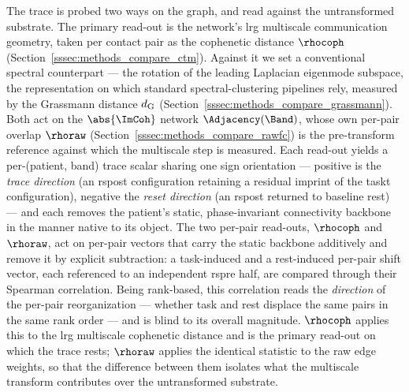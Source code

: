%
The trace is probed two ways on the graph, and read against the untransformed substrate. The primary read-out is the network's \gls{lrg} multiscale communication geometry, taken per contact pair as the cophenetic distance \(\rhocoph\) (Section~\ref{sssec:methods_compare_ctm}). Against it we set a conventional spectral counterpart --- the rotation of the leading Laplacian eigenmode subspace, the representation on which standard spectral-clustering pipelines rely, measured by the Grassmann distance \(d_{\rm G}\) (Section~\ref{sssec:methods_compare_grassmann}). Both act on the \(\abs{\ImCoh}\) network \(\Adjacency(\Band)\), whose own per-pair overlap \(\rhoraw\) (Section~\ref{sssec:methods_compare_rawfc}) is the pre-transform reference against which the multiscale step is measured. Each read-out yields a per-(patient, band) trace scalar sharing one sign orientation --- positive is the \emph{trace direction} (an \acrshort{rspost} configuration retaining a residual imprint of the \acrshort{taskt} configuration), negative the \emph{reset direction} (an \acrshort{rspost} returned to baseline rest) --- and each removes the patient's static, phase-invariant connectivity backbone in the manner native to its object.
%
The two per-pair read-outs, \(\rhocoph\) and \(\rhoraw\), act on per-pair vectors that carry the static backbone additively and remove it by explicit subtraction: a task-induced and a rest-induced per-pair shift vector, each referenced to an independent \acrshort{rspre} half, are compared through their Spearman correlation. Being rank-based, this correlation reads the \emph{direction} of the per-pair reorganization --- whether task and rest displace the same pairs in the same rank order --- and is blind to its overall magnitude. \(\rhocoph\) applies this to the \gls{lrg} multiscale cophenetic distance and is the primary read-out on which the trace rests; \(\rhoraw\) applies the identical statistic to the raw edge weights, so that the difference between them isolates what the multiscale transform contributes over the untransformed substrate.
%
